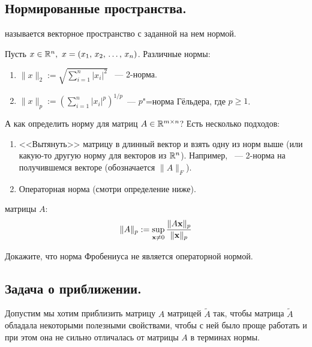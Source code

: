 \newpage
{}

\subsection{Нормированные пространства.}

\begin{definition}
     называется векторное пространство с заданной на нем нормой.
\end{definition}

\begin{exercise}
    Пусть $x\in\mathbb{R}^n,\ x = (x_1,\, x_2,\, \ldots,\, x_n)$.
    Различные нормы:
    \begin{enumerate}
        \item $\|x\|_2:=\sqrt{\sum\limits_{i=1}^n |x_i|^2}$ ~--- 2-норма.
        \item $\|x\|_p:=\left(\sum\limits_{i=1}^n|x_i|^p\right)^{1/p}$~--- $p$"=норма Гёльдера, где $p\geqslant 1$.
    \end{enumerate}
\end{exercise}

А как определить норму для матриц $A\in\mathbb{R}^{m\times n}$? Есть несколько подходов:
\begin{enumerate}
    \item <<Вытянуть>> матрицу в длинный вектор и взять одну из норм выше (или какую-то другую норму для векторов из $\mathbb{R}^n$).
          Например, ~--- 2-норма на получившемся векторе (обозначается $\|A\|_F$).
    \item Операторная норма (смотри определение ниже).
\end{enumerate}

\begin{definition}
     матрицы $A$:
    \[
        \|A\|_p:=\sup_{\mathbf{x}\neq 0}\dfrac{\|A\mathbf{x}\|_p}{\|\mathbf{x}\|_p}
    \]
\end{definition}

\begin{exercise}
    Докажите, что норма Фробениуса не является операторной нормой.
\end{exercise}

\subsection{Задача о приближении.}
Допустим мы хотим приблизить матрицу $A$ матрицей $\widetilde{A}$ так, чтобы матрица $\widetilde{A}$ обладала некоторыми
полезными свойствами, чтобы с ней было проще работать и при этом она не сильно отличалась от матрицы $A$ в терминах нормы.

